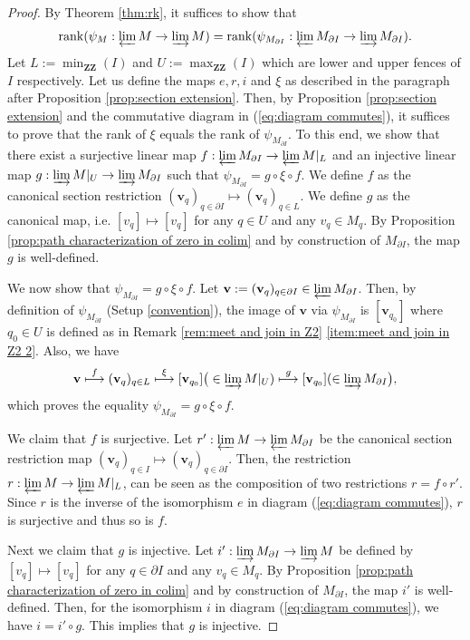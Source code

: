 \documentclass[11pt]{article}
\theoremstyle{definition}
\newcommand{\bv}{\mathbf{v}}
\newcommand{\ZZ}{\mathbf{ZZ}}
\newcommand{\rank}{\mathrm{rank}}
\begin{document}
\begin{proof}
By Theorem \ref{thm:rk}, it suffices to show that
\[\rank(\psi_M:\varprojlim M \rightarrow \varinjlim M)=\rank(\psi_{M_{\partial I}}:\varprojlim M_{\partial I} \rightarrow \varinjlim M_{\partial I}).\]
Let $L:=\min_{\ZZ}(I)$ and $U:=\max_{\ZZ}(I)$ which are lower and upper fences of $I$ respectively. Let us define the maps $e,r,i$ and $\xi$ as described in the paragraph after Proposition \ref{prop:section extension}. Then, by Proposition \ref{prop:section extension} and the commutative diagram in (\ref{eq:diagram commutes}), it suffices to prove that the rank of $\xi$ equals the rank of $\psi_{M_{\partial I}}$.
To this end, we show that there exist a surjective linear map $f:\varprojlim M_{\partial I}\rightarrow \varprojlim M|_L$ and an injective linear map $g:\varinjlim M|_U \rightarrow \varinjlim M_{\partial I}$ such that $\psi_{M_{\partial I}}=g\circ \xi \circ f$. We define $f$ as the canonical section restriction $(\bv_q)_{q\in \partial I}\mapsto (\bv_{q})_{q\in L}$. We define $g$ as the canonical map, i.e. $[v_{q}]\mapsto [v_q]$ for any $q\in U$ and any $v_q\in M_q$. By Proposition \ref{prop:path characterization of zero in colim} and  by construction of $M_{\partial I}$, the map $g$ is well-defined. 

We now show that $\psi_{M_{\partial I}}=g\circ \xi \circ f$. Let $\bv:=(\bv_q)_{q\in \partial I}\in \varprojlim M_{\partial I}$. Then, by definition of $\psi_{M_{\partial I}}$ (Setup \ref{convention}), the image of $\bv$ via $\psi_{M_{\partial I}}$ is $[\bv_{q_0}]$ where $q_0\in U$ is defined as in Remark \ref{rem:meet and join in Z2} \ref{item:meet and join in Z2 2}. Also, we have \[\bv\stackrel{f}{\longmapsto} (\bv_{q})_{q\in L} \stackrel{\xi}{\longmapsto} [\bv_{q_0}] \big(\in \varinjlim M|_U) \stackrel{g}{\longmapsto} [\bv_{q_0}] (\in \varinjlim M_{\partial I}\big),\] which proves the equality $\psi_{M_{\partial I}}=g\circ \xi \circ f$.

We claim that $f$ is surjective. Let $r':\varprojlim M \rightarrow \varprojlim M_{\partial I}$ be the canonical section restriction map $(\bv_q)_{q\in I}\mapsto (\bv_{q})_{q\in \partial I}$. Then, the restriction $r:\varprojlim M \rightarrow \varprojlim M|_L$, can be seen as the composition of two restrictions $r=f\circ r'$.
 Since $r$ is the inverse of the isomorphism $e$ in diagram (\ref{eq:diagram commutes}), $r$ is surjective and thus so is $f$. 

Next we claim that $g$ is injective. Let $i':\varinjlim M_{\partial I}\rightarrow \varinjlim M$ be defined by $[v_q]\mapsto [v_q]$ for any $q\in \partial I$ and any $v_q\in M_q$.  By Proposition \ref{prop:path characterization of zero in colim} and  by construction of $M_{\partial I}$, the map $i'$ is well-defined. Then, for the isomorphism $i$ in diagram (\ref{eq:diagram commutes}), we have $i=i'\circ g$. This implies that $g$ is injective.
\end{proof}
\end{document}
